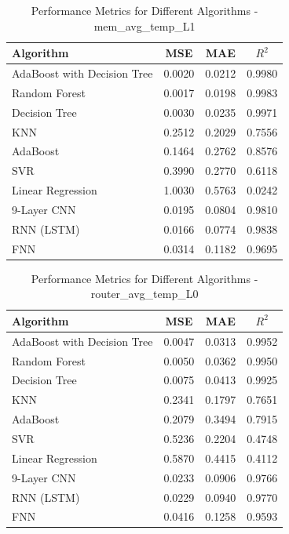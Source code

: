 \documentclass[conference]{IEEEtran}
\begin{document}
\begin{table}[htbp]
	\caption{Performance Metrics for Different Algorithms - mem\_avg\_temp\_L1}
	\label{tab:mem_avg_temp_L1}
	\begin{tabular}{lccc}
		\toprule
		\textbf{Algorithm} & \textbf{MSE} & \textbf{MAE} & \textbf{\(R^2\)} \\
		\midrule
		AdaBoost with Decision Tree & 0.0020 & 0.0212 & 0.9980 \\
		Random Forest & 0.0017 & 0.0198 & 0.9983 \\
		Decision Tree & 0.0030 & 0.0235 & 0.9971 \\
		KNN & 0.2512 & 0.2029 & 0.7556 \\
		AdaBoost & 0.1464 & 0.2762 & 0.8576 \\
		SVR & 0.3990 & 0.2770 & 0.6118 \\
		Linear Regression & 1.0030 & 0.5763 & 0.0242 \\
		9-Layer CNN                & 0.0195       & 0.0804       & 0.9810      \\ 
		RNN (LSTM)  & 0.0166       & 0.0774       & 0.9838      \\ 
		FNN                & 0.0314       & 0.1182       & 0.9695      \\ 
		\bottomrule
	\end{tabular}
\end{table}

\begin{table}[htbp]
	\caption{Performance Metrics for Different Algorithms - router\_avg\_temp\_L0}
	\label{tab:router_avg_temp_L0}
	\begin{tabular}{lccc}
		\toprule
		\textbf{Algorithm} & \textbf{MSE} & \textbf{MAE} & \textbf{\(R^2\)} \\
		\midrule
		AdaBoost with Decision Tree & 0.0047 & 0.0313 & 0.9952 \\
		Random Forest & 0.0050 & 0.0362 & 0.9950 \\
		Decision Tree & 0.0075 & 0.0413 & 0.9925 \\
		KNN & 0.2341 & 0.1797 & 0.7651 \\
		AdaBoost & 0.2079 & 0.3494 & 0.7915 \\
		SVR & 0.5236 & 0.2204 & 0.4748 \\
		Linear Regression & 0.5870 & 0.4415 & 0.4112 \\
		9-Layer CNN                & 0.0233       & 0.0906       & 0.9766      \\ 
		RNN (LSTM)  & 0.0229       & 0.0940       & 0.9770      \\ 
		FNN                & 0.0416       & 0.1258       & 0.9593      \\ 
		\bottomrule
	\end{tabular}
\end{table}
\end{document}
